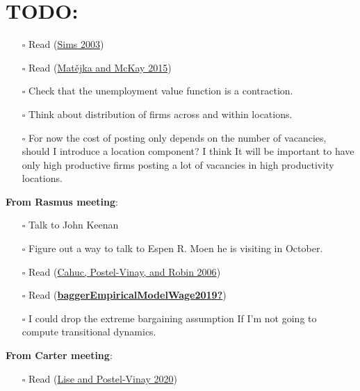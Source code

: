 \documentclass[
  letterpaper,
  DIV=11,
  numbers=noendperiod]{scrreprt}
\providecommand{\tightlist}{%
  \setlength{\itemsep}{0pt}\setlength{\parskip}{0pt}}\usepackage{longtable,booktabs,array}
\begin{document}
\hypertarget{todo}{%
\section{\texorpdfstring{\textbf{TODO}:}{TODO:}}\label{todo}}

\begin{itemize}
\tightlist
\item[$\square$]
  Read
  (\protect\hyperlink{ref-simsImplicationsRationalInattention2003}{Sims
  2003})
\item[$\square$]
  Read
  (\protect\hyperlink{ref-matejkaRationalInattentionDiscrete2015}{Matějka
  and McKay 2015})
\item[$\square$]
  Check that the unemployment value function is a contraction.
\item[$\square$]
  Think about distribution of firms across and within locations.
\item[$\square$]
  For now the cost of posting only depends on the number of vacancies,
  should I introduce a location component? I think It will be important
  to have only high productive firms posting a lot of vacancies in high
  productivity locations.
\end{itemize}

\textbf{From Rasmus meeting}:

\begin{itemize}
\tightlist
\item[$\square$]
  Talk to John Keenan
\item[$\square$]
  Figure out a way to talk to Espen R. Moen he is visiting in October.
\item[$\square$]
  Read (\protect\hyperlink{ref-cahucWageBargainingOntheJob2006}{Cahuc,
  Postel-Vinay, and Robin 2006})
\item[$\square$]
  Read
  (\protect\hyperlink{ref-baggerEmpiricalModelWage2019}{\textbf{baggerEmpiricalModelWage2019?}})
\item[$\square$]
  I could drop the extreme bargaining assumption If I'm not going to
  compute transitional dynamics.
\end{itemize}

\textbf{From Carter meeting}:

\begin{itemize}
\tightlist
\item[$\square$]
  Read
  (\protect\hyperlink{ref-liseMultidimensionalSkillsSorting2020}{Lise
  and Postel-Vinay 2020})
\end{itemize}
\end{document}

